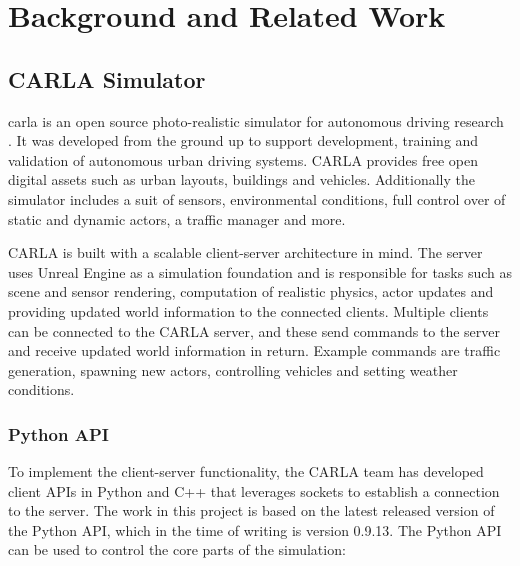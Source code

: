 \chapter{Background and Related Work}
\label{chap:background}


\section{CARLA Simulator}
\acrfull{carla} is an open source photo-realistic simulator for autonomous driving research \cite{introducing-carla-paper}. It was developed from the ground up to support development, training and validation of autonomous urban driving systems. CARLA provides free open digital assets such as urban layouts, buildings and vehicles. Additionally the simulator includes a suit of sensors, environmental conditions, full control over of static and dynamic actors, a traffic manager and more.

CARLA is built with a scalable client-server architecture in mind. The server uses Unreal Engine \cite{unrealengine} as a simulation foundation and is responsible for tasks such as scene and sensor rendering, computation of realistic physics, actor updates and providing updated world information to the connected clients. Multiple clients can be connected to the CARLA server, and these send commands to the server and receive updated world information in return. Example commands are traffic generation, spawning new actors, controlling vehicles and setting weather conditions.

\subsection{Python API}
To implement the client-server functionality, the CARLA team has developed client APIs in Python \cite{carla-python-api} and C++ \cite{carla-cplusplus-api} that leverages sockets to establish a connection to the server. The work in this project is based on the latest released version of the Python API, which in the time of writing is version 0.9.13. The Python API can be used to control the core parts of the simulation: 


